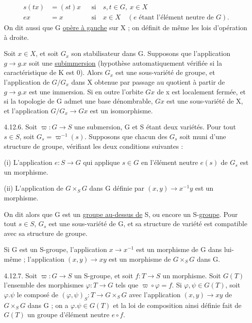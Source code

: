 \[
\begin{aligned}
s(tx)&=(st)x&&\text{si}\quad s,t\in G,\ x\in X\\
ex&=x&&\text{si}\quad x\in X\quad(e\text{ étant l'élément neutre de }G).
\end{aligned}
\]
On dit aussi que G \uline{opère à gauche} sur X ; on définit de même les lois d'opération à droite.

Soit $x\in X$, et soit $G_x$ son stabilisateur dans G. Supposons que l'application $g\longrightarrow g.x$ soit une \uline{subimmersion} (hypothèse automatiquement vérifiée si la caractéristique de K est 0). Alors $G_x$ est une sous-variété de groupe, et l'application de $G/G_x$ dans X obtenue par passage au quotient à partir de $g\longrightarrow g.x$ est une immersion. Si en outre l'orbite $Gx$ de x est localement fermée, et si la topologie de G admet une base dénombrable, $Gx$ est une sous-variété de X, et l'application $G/G_x\longrightarrow Gx$ est un isomorphisme.

4.12.6. Soit $\varpi:G\longrightarrow S$ une submersion, G et S étant deux variétés. Pour tout $s\in S$, soit $G_s=\varpi^{-1}(s)$. Supposons que chacun des $G_s$ soit muni d'une structure de groupe, vérifiant les deux conditions suivantes :

(i) L'application $e:S\longrightarrow G$ qui applique $s\in G$ en l'élément neutre $e(s)$ de $G_s$ est un morphisme.

(ii) L'application de $G\times_S G$ dans G définie par $(x,y)\longrightarrow x^{-1}y$ est un morphisme.

On dit alors que G est un \uline{groupe au-dessus de} S, ou encore un S-\uline{groupe}. Pour tout $s\in S$, $G_s$ est une sous-variété de G, et sa structure de variété est compatible avec sa structure de groupe.

Si G est un S-groupe, l'application $x\longrightarrow x^{-1}$ est un morphisme de G dans lui-même ; l'application $(x,y)\longrightarrow xy$ est un morphisme de $G\times_S G$ dans G.

4.12.7. Soit $\varpi:G\longrightarrow S$ un S-groupe, et soit $f:T\longrightarrow S$ un morphisme. Soit $G(T)$ l'ensemble des morphismes $\varphi:T\longrightarrow G$ tels que $\varpi\circ\varphi=f$. Si $\varphi,\psi\in G(T)$, soit $\varphi.\psi$ le composé de $(\varphi,\psi)_S:T\longrightarrow G\times_S G$ avec l'application $(x,y)\longrightarrow xy$ de $G\times_S G$ dans G ; on a $\varphi.\psi\in G(T)$ et la loi de composition ainsi définie fait de $G(T)$ un groupe d'élément neutre $e\circ f$.

